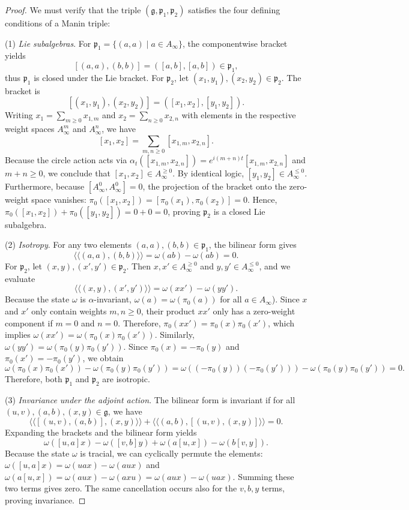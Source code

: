 \documentclass[10pt,a4paper]{amsart}
\begin{document}
\begin{proof}
We must verify that the triple $(\mathfrak{g}, \mathfrak{p}_1, \mathfrak{p}_2)$ satisfies the four defining conditions of a Manin triple:

(1) \textit{Lie subalgebras}. For $\mathfrak{p}_1 = \{(a, a) \mid a \in A_{\infty}\}$, the componentwise bracket yields
\[
[(a, a), (b, b)] = ([a, b], [a, b]) \in \mathfrak{p}_1,
\]
thus $\mathfrak{p}_1$ is closed under the Lie bracket. For $\mathfrak{p}_2$, let $(x_1, y_1), (x_2, y_2) \in \mathfrak{p}_2$. The bracket is
\[
[(x_1, y_1), (x_2, y_2)] = ([x_1, x_2], [y_1, y_2]).
\]
Writing $x_1 = \sum_{m \ge 0} x_{1,m}$ and $x_2 = \sum_{n \ge 0} x_{2,n}$ with elements in the respective weight spaces $A_{\infty}^m$ and $A_{\infty}^n$, we have
\[
[x_1, x_2] = \sum_{m, n \ge 0} [x_{1,m}, x_{2,n}].
\]
Because the circle action acts via $\alpha_t([x_{1,m}, x_{2,n}]) = e^{i(m+n)t}[x_{1,m}, x_{2,n}]$ and $m+n \ge 0$, we conclude that $[x_1, x_2] \in A_{\infty}^{\ge 0}$. By identical logic, $[y_1, y_2] \in A_{\infty}^{\le 0}$. Furthermore, because $[A_{\infty}^0, A_{\infty}^0] = 0$, the projection of the bracket onto the zero-weight space vanishes: $\pi_0([x_1, x_2]) = [\pi_0(x_1), \pi_0(x_2)] = 0$. Hence, $\pi_0([x_1, x_2]) + \pi_0([y_1, y_2]) = 0 + 0 = 0$, proving $\mathfrak{p}_2$ is a closed Lie subalgebra.

(2) \textit{Isotropy}. For any two elements $(a, a), (b, b) \in \mathfrak{p}_1$, the bilinear form gives
\[
\langle\langle (a, a), (b, b) \rangle\rangle = \omega(ab) - \omega(ab) = 0.
\]
For $\mathfrak{p}_2$, let $(x, y), (x', y') \in \mathfrak{p}_2$. Then $x, x' \in A_{\infty}^{\ge 0}$ and $y, y' \in A_{\infty}^{\le 0}$, and we evaluate
\[
\langle\langle (x, y), (x', y') \rangle\rangle = \omega(xx') - \omega(yy').
\]
Because the state $\omega$ is $\alpha$-invariant, $\omega(a) = \omega(\pi_0(a))$ for all $a \in A_\infty$). Since $x$ and $x'$ only contain weights $m, n \ge 0$, their product $xx'$ only has a zero-weight component if $m=0$ and $n=0$. Therefore, $\pi_0(xx') = \pi_0(x)\pi_0(x')$, which implies $\omega(xx') = \omega(\pi_0(x)\pi_0(x'))$. Similarly, $\omega(yy') = \omega(\pi_0(y)\pi_0(y'))$. Since $\pi_0(x) = -\pi_0(y)$ and $\pi_0(x') = -\pi_0(y')$, we obtain
\[
\omega(\pi_0(x)\pi_0(x')) - \omega(\pi_0(y)\pi_0(y')) = \omega((-\pi_0(y))(-\pi_0(y'))) - \omega(\pi_0(y)\pi_0(y')) = 0.
\]
Therefore, both $\mathfrak{p}_1$ and $\mathfrak{p}_2$ are isotropic.

(3) \textit{Invariance under the adjoint action}. The bilinear form is invariant if for all $(u, v), (a, b), (x, y) \in \mathfrak{g}$, we have
\[
\langle\langle [(u, v), (a, b)], (x, y) \rangle\rangle + \langle\langle (a, b), [(u, v), (x, y)] \rangle\rangle = 0.
\]
Expanding the brackets and the bilinear form yields
\[
\omega([u, a]x) - \omega([v, b]y) + \omega(a[u, x]) - \omega(b[v, y]).
\]
Because the state $\omega$ is tracial, we can cyclically permute the elements: $\omega([u,a]x) = \omega(uax) - \omega(aux)$ and $\omega(a[u,x]) = \omega(aux) - \omega(axu) = \omega(aux) - \omega(uax)$. Summing these two terms gives zero. The same cancellation occurs also for the $v, b, y$ terms, proving invariance.


\end{proof}
\end{document}
